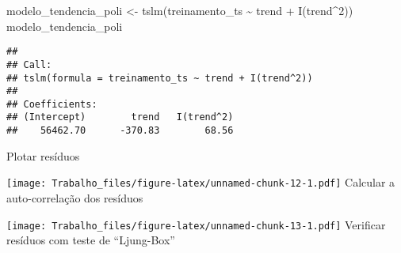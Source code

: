 \documentclass[
]{article}
\newenvironment{Shaded}{\begin{snugshade}}{\end{snugshade}}
\newcommand{\AttributeTok}[1]{\textcolor[rgb]{0.77,0.63,0.00}{#1}}
\newcommand{\DecValTok}[1]{\textcolor[rgb]{0.00,0.00,0.81}{#1}}
\newcommand{\FunctionTok}[1]{\textcolor[rgb]{0.00,0.00,0.00}{#1}}
\newcommand{\NormalTok}[1]{#1}
\newcommand{\OtherTok}[1]{\textcolor[rgb]{0.56,0.35,0.01}{#1}}
\newcommand{\SpecialCharTok}[1]{\textcolor[rgb]{0.00,0.00,0.00}{#1}}
\newcommand{\StringTok}[1]{\textcolor[rgb]{0.31,0.60,0.02}{#1}}
\begin{document}
\begin{Shaded}
\begin{Highlighting}[]
\NormalTok{modelo\_tendencia\_poli }\OtherTok{\textless{}{-}} \FunctionTok{tslm}\NormalTok{(treinamento\_ts }\SpecialCharTok{\textasciitilde{}}\NormalTok{ trend }\SpecialCharTok{+} \FunctionTok{I}\NormalTok{(trend}\SpecialCharTok{\^{}}\DecValTok{2}\NormalTok{))}
\NormalTok{modelo\_tendencia\_poli}
\end{Highlighting}
\end{Shaded}

\begin{verbatim}
## 
## Call:
## tslm(formula = treinamento_ts ~ trend + I(trend^2))
## 
## Coefficients:
## (Intercept)        trend   I(trend^2)  
##    56462.70      -370.83        68.56
\end{verbatim}

Plotar resíduos

\begin{Shaded}
\end{Shaded}

\texttt{[image: Trabalho\_files/figure-latex/unnamed-chunk-12-1.pdf]}
Calcular a auto-correlação dos resíduos

\begin{Shaded}
\end{Shaded}

\texttt{[image: Trabalho\_files/figure-latex/unnamed-chunk-13-1.pdf]}
Verificar resíduos com teste de ``Ljung-Box''

\begin{Shaded}
\end{Shaded}
\end{document}
